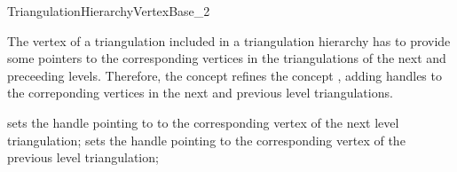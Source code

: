 

\begin{ccRefConcept}{TriangulationHierarchyVertexBase_2}


\ccDefinition 
The vertex of a triangulation  
included in a  triangulation hierarchy has to provide
some pointers to the corresponding vertices in the
triangulations of the next and preceeding levels.
Therefore, the concept 
refines the concept ,
adding handles to the correponding vertices in the
next and previous level triangulations.



\ccRefines
{}




\ccOperations
{}
\ccGlue
{}
\ccGlue
{}
{sets the handle pointing to  to the corresponding vertex
of the next level triangulation;} 
\ccGlue 
{}
{sets the handle pointing  to the corresponding vertex
of the previous level triangulation;}

\ccHasModels
{}

\ccSeeAlso
{} 


\end{ccRefConcept}



